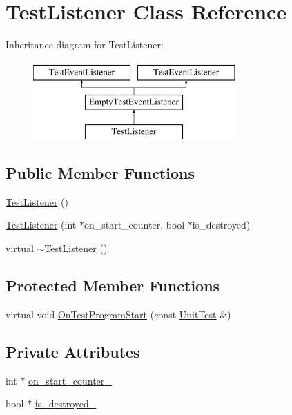 \hypertarget{classTestListener}{\section{\-Test\-Listener \-Class \-Reference}
\label{d4/d81/classTestListener}
}
\-Inheritance diagram for \-Test\-Listener\-:\begin{figure}[H]
\begin{center}
\leavevmode
\includegraphics[height=3.000000cm]{d4/d81/classTestListener}
\end{center}
\end{figure}
\subsection*{\-Public \-Member \-Functions}
\begin{DoxyCompactItemize}
\item 
\hyperlink{classTestListener_acaca19395621640847c7d3706217eb2a}{\-Test\-Listener} ()
\item 
\hyperlink{classTestListener_aa94b81fa38ae79f6f6181d4900493718}{\-Test\-Listener} (int $\ast$on\-\_\-start\-\_\-counter, bool $\ast$is\-\_\-destroyed)
\item 
virtual \hyperlink{classTestListener_a08bd0af4874a731bfab7cd7f0ab0df54}{$\sim$\-Test\-Listener} ()
\end{DoxyCompactItemize}
\subsection*{\-Protected \-Member \-Functions}
\begin{DoxyCompactItemize}
\item 
virtual void \hyperlink{classTestListener_a9d43d6e5c4c37ade824998de2d83bd20}{\-On\-Test\-Program\-Start} (const \hyperlink{classtesting_1_1UnitTest}{\-Unit\-Test} \&)
\end{DoxyCompactItemize}
\subsection*{\-Private \-Attributes}
\begin{DoxyCompactItemize}
\item 
int $\ast$ \hyperlink{classTestListener_a6cec3b3ede5f422fc838ea5729c7fa8d}{on\-\_\-start\-\_\-counter\-\_\-}
\item 
bool $\ast$ \hyperlink{classTestListener_a77af937493a52de2449bc2701314c146}{is\-\_\-destroyed\-\_\-}
\end{DoxyCompactItemize}


